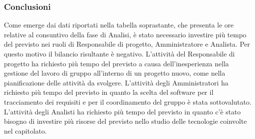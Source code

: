 \subsubsection{Conclusioni}
Come emerge dai dati riportati nella tabella soprastante, che presenta le ore relative al consuntivo della fase di Analisi, è stato necessario investire più tempo del previsto nei ruoli di Responsabile di progetto, Amministratore e Analista. Per questo motivo il bilancio risultante è negativo. L'attività del Responsabile di progetto ha richiesto più tempo del previsto a causa dell'inesperienza nella gestione del lavoro di gruppo all'interno di un progetto  nuovo, come nella pianificazione delle attività da svolgere. L'attività degli Amministratori ha richiesto più tempo del previsto in quanto la scelta del software per il tracciamento dei requisiti e per il coordinamento del gruppo è stata sottovalutato. L'attività degli Analisti ha richiesto più tempo del previsto in quanto c'è stato bisogno di investire più risorse del previsto nello studio delle tecnologie coinvolte nel capitolato. 